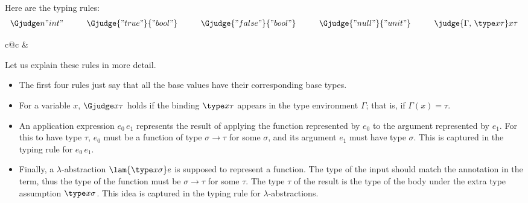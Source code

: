 Here are the typing rules:
\[
\begin{array}{c@{\hspace{1cm}}c@{\hspace{1cm}}c@{\hspace{1cm}}c@{\hspace{1cm}}c}
\Gjudge n{"int"} & \Gjudge{"true"}{"bool"} & \Gjudge{"false"}{"bool"} & \Gjudge{"null"}{"unit"} & \judge{\Gamma,\,\type x\tau}x\tau
\end{array}
\]
\begin{center}
\begin{tabular}{c@{\hspace{1cm}}c}
& 
\end{tabular}
\end{center}
Let us explain these rules in more detail.
\begin{itemize}
\item
The first four rules just say that all the base values have their corresponding base types.
\item
For a variable $x$, $\Gjudge x\tau$ holds if the binding $\type x\tau$ appears in the type environment $\Gamma$; that is, if $\Gamma(x)=\tau$.
\item
An application expression $e_0\,e_1$ represents the result of applying the function represented by $e_0$ to the argument represented by $e_1$. For this to have type $\tau$, $e_0$ must be a function of type $\sigma\to\tau$ for some $\sigma$, and its argument $e_1$ must have type $\sigma$. This is captured in the typing rule for $e_0\,e_1$.
\item
Finally, a $\lambda$-abstraction $\lam{\type x\sigma}e$ is supposed to represent a function. The type of the input should match the annotation in the term, thus the type of the function must be $\sigma\to\tau$ for some $\tau$. The type $\tau$ of the result is the type of the body under the extra type assumption $\type x\sigma$. This idea is captured in the typing rule for $\lambda$-abstractions.
\end{itemize}

